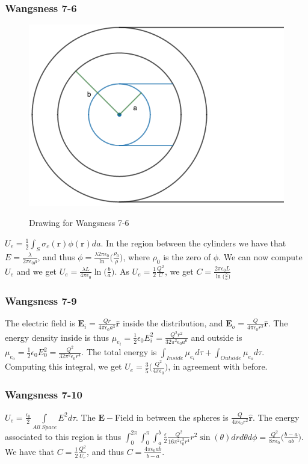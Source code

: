 \documentclass{article}
\theoremstyle{mystyle}
\begin{document}
\subsubsection{Wangsness 7-6}
\begin{figure}[htbp]
    \centering
    {\includegraphics[scale=0.4]{7-6.png}}
    \caption{Drawing for Wangsness 7-6}
\end{figure}
$U_e = \frac{1}{2}\int_{S}\sigma_c(\mathbf{r})\phi(\mathbf{r})da$. In the region between the cylinders we have that $E = \frac{\lambda}{2\pi \epsilon_0 \rho}$, and thus $\phi= \frac{\lambda 2\pi \epsilon_0}\ln\big(\frac{\rho_0}{\rho}\big)$, where $\rho_0$ is the zero of $\phi$. We can now compute $U_e$ and we get $U_e = \frac{\lambda L}{4\pi \epsilon_0}\ln\big(\frac{b}{a}\big)$. As $U_e = \frac{1}{2}\frac{Q^2}{C}$, we get $C= \frac{2\pi \epsilon_0 L}{\ln\big(\frac{b}{a}\big)}$
\subsubsection{Wangsness 7-9}
The electric field is $\mathbf{E}_i = \frac{Qr}{4\pi \epsilon_0 a^3}\hat{\mathbf{r}}$ inside the distribution, and $\mathbf{E}_o = \frac{Q}{4\pi\epsilon_0r^2}\hat{\mathbf{r}}$. The energy density inside is thus $\mu_{e_i} = \frac{1}{2}\epsilon_0 E_i^2=\frac{Q^2r^2}{32\pi^2 \epsilon_0 a^6}$ and outside is $\mu_{e_o} = \frac{1}{2}\epsilon_0 E_0^2 = \frac{Q^2}{32\pi^2 \epsilon_0 r^4}$. The total energy is $\int_{Inside} \mu_{e_i}d\tau + \int_{Outside} \mu_{e_o}d\tau$. Computing this integral, we get $U_e = \frac{3}{5}\bigg( \frac{Q^2}{4\pi \epsilon_0}\bigg)$, in agreement with before.
\subsubsection{Wangsness 7-10}
$U_e = \frac{\epsilon_0}{2} \underset{All\ Space}\int E^2 d\tau$. The $\mathbf{E}-$Field in between the spheres is $\frac{Q}{4\pi \epsilon_0 r^2}\hat{\mathbf{r}}$. The energy associated to this region is thus $\int_{0}^{2\pi}\int_{0}^{\pi}\int_{a}^{b} \frac{\epsilon}{2} \frac{Q^2}{16\pi^2 \epsilon_0^2 r^4}r^2\sin(\theta) dr d\theta d\phi = \frac{Q^2}{8\pi \epsilon_0}\bigg(\frac{b-a}{ab}\bigg)$. We have that $C = \frac{1}{2} \frac{Q^2}{U_e}$, and thus $C = \frac{4\pi \epsilon_0 ab}{b-a}$.
\end{document}

